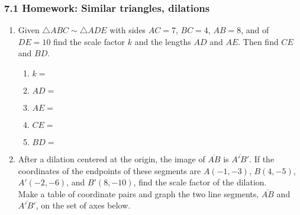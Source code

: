 \documentclass[12pt, twoside]{article}
\begin{document}
\subsubsection*{7.1 Homework: Similar triangles, dilations}
  \begin{enumerate}

    \item Given $\triangle ABC \sim \triangle ADE$ with sides $AC = 7$, $BC = 4$, $AB = 8$, and of $DE = 10$ find the scale factor $k$ and the lengths $AD$ and $AE$. Then find $CE$ and $BD$. %
    \begin{multicols}{2}
      \begin{enumerate}
        \item $k=$ \vspace{0.3cm}
        \item $AD=$ \vspace{0.3cm}
        \item $AE=$ \vspace{0.3cm}
        \item $CE=$
        \item $BD=$
      \end{enumerate}
      \begin{flushright}
      \end{flushright} 
    \end{multicols}%

  \item After a dilation centered at the origin, the image of $\overline{AB}$ is $\overline{A'B'}$. If the coordinates of the endpoints of these segments are $A(-1,-3)$, $B(4,-5)$, $A'(-2,-6)$, and $B'(8,-10)$, find the scale factor of the dilation.\\[0.25cm]
  Make a table of coordinate pairs and graph the two line segments,  $\overline{AB}$ and  $\overline{A'B'}$, on the set of axes below.
    \begin{flushright}
    \end{flushright}




\end{enumerate}
\end{document}
